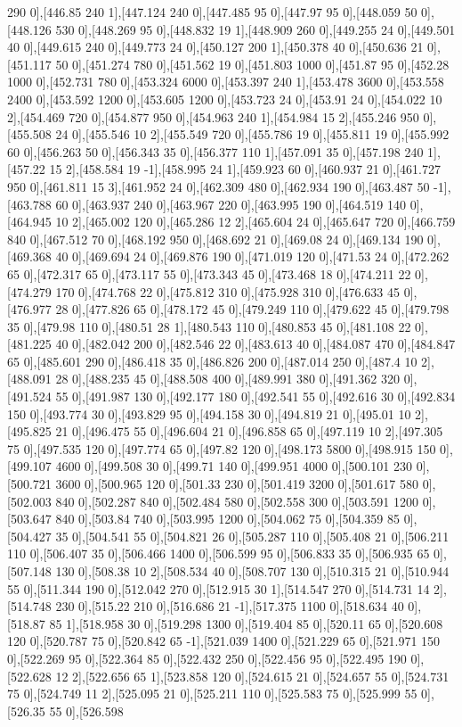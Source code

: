 {290 0],[446.85 240 1],[447.124 240 0],[447.485 95 0],[447.97 95 0],[448.059 50 0],[448.126 530 0],[448.269 95 0],[448.832 19 1],[448.909 260 0],[449.255 24 0],[449.501 40 0],[449.615 240 0],[449.773 24 0],[450.127 200 1],[450.378 40 0],[450.636 21 0],[451.117 50 0],[451.274 780 0],[451.562 19 0],[451.803 1000 0],[451.87 95 0],[452.28 1000 0],[452.731 780 0],[453.324 6000 0],[453.397 240 1],[453.478 3600 0],[453.558 2400 0],[453.592 1200 0],[453.605 1200 0],[453.723 24 0],[453.91 24 0],[454.022 10 2],[454.469 720 0],[454.877 950 0],[454.963 240 1],[454.984 15 2],[455.246 950 0],[455.508 24 0],[455.546 10 2],[455.549 720 0],[455.786 19 0],[455.811 19 0],[455.992 60 0],[456.263 50 0],[456.343 35 0],[456.377 110 1],[457.091 35 0],[457.198 240 1],[457.22 15 2],[458.584 19 -1],[458.995 24 1],[459.923 60 0],[460.937 21 0],[461.727 950 0],[461.811 15 3],[461.952 24 0],[462.309 480 0],[462.934 190 0],[463.487 50 -1],[463.788 60 0],[463.937 240 0],[463.967 220 0],[463.995 190 0],[464.519 140 0],[464.945 10 2],[465.002 120 0],[465.286 12 2],[465.604 24 0],[465.647 720 0],[466.759 840 0],[467.512 70 0],[468.192 950 0],[468.692 21 0],[469.08 24 0],[469.134 190 0],[469.368 40 0],[469.694 24 0],[469.876 190 0],[471.019 120 0],[471.53 24 0],[472.262 65 0],[472.317 65 0],[473.117 55 0],[473.343 45 0],[473.468 18 0],[474.211 22 0],[474.279 170 0],[474.768 22 0],[475.812 310 0],[475.928 310 0],[476.633 45 0],[476.977 28 0],[477.826 65 0],[478.172 45 0],[479.249 110 0],[479.622 45 0],[479.798 35 0],[479.98 110 0],[480.51 28 1],[480.543 110 0],[480.853 45 0],[481.108 22 0],[481.225 40 0],[482.042 200 0],[482.546 22 0],[483.613 40 0],[484.087 470 0],[484.847 65 0],[485.601 290 0],[486.418 35 0],[486.826 200 0],[487.014 250 0],[487.4 10 2],[488.091 28 0],[488.235 45 0],[488.508 400 0],[489.991 380 0],[491.362 320 0],[491.524 55 0],[491.987 130 0],[492.177 180 0],[492.541 55 0],[492.616 30 0],[492.834 150 0],[493.774 30 0],[493.829 95 0],[494.158 30 0],[494.819 21 0],[495.01 10 2],[495.825 21 0],[496.475 55 0],[496.604 21 0],[496.858 65 0],[497.119 10 2],[497.305 75 0],[497.535 120 0],[497.774 65 0],[497.82 120 0],[498.173 5800 0],[498.915 150 0],[499.107 4600 0],[499.508 30 0],[499.71 140 0],[499.951 4000 0],[500.101 230 0],[500.721 3600 0],[500.965 120 0],[501.33 230 0],[501.419 3200 0],[501.617 580 0],[502.003 840 0],[502.287 840 0],[502.484 580 0],[502.558 300 0],[503.591 1200 0],[503.647 840 0],[503.84 740 0],[503.995 1200 0],[504.062 75 0],[504.359 85 0],[504.427 35 0],[504.541 55 0],[504.821 26 0],[505.287 110 0],[505.408 21 0],[506.211 110 0],[506.407 35 0],[506.466 1400 0],[506.599 95 0],[506.833 35 0],[506.935 65 0],[507.148 130 0],[508.38 10 2],[508.534 40 0],[508.707 130 0],[510.315 21 0],[510.944 55 0],[511.344 190 0],[512.042 270 0],[512.915 30 1],[514.547 270 0],[514.731 14 2],[514.748 230 0],[515.22 210 0],[516.686 21 -1],[517.375 1100 0],[518.634 40 0],[518.87 85 1],[518.958 30 0],[519.298 1300 0],[519.404 85 0],[520.11 65 0],[520.608 120 0],[520.787 75 0],[520.842 65 -1],[521.039 1400 0],[521.229 65 0],[521.971 150 0],[522.269 95 0],[522.364 85 0],[522.432 250 0],[522.456 95 0],[522.495 190 0],[522.628 12 2],[522.656 65 1],[523.858 120 0],[524.615 21 0],[524.657 55 0],[524.731 75 0],[524.749 11 2],[525.095 21 0],[525.211 110 0],[525.583 75 0],[525.999 55 0],[526.35 55 0],[526.598 }
